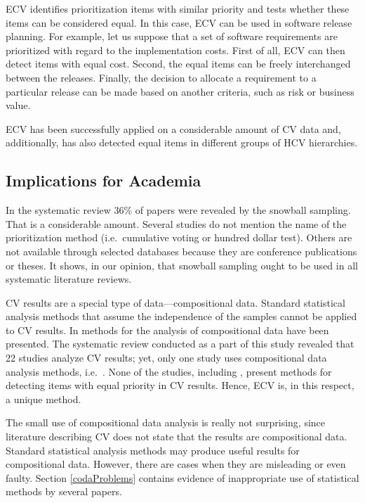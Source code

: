 ECV identifies prioritization items with similar priority and tests whether these items can be considered equal.
In this case, ECV can be used in software release planning.
For example, let us suppose that a set of software requirements are prioritized with regard to the implementation costs.
First of all, ECV can then detect items with equal cost.
Second, the equal items can be freely interchanged between the releases.
Finally, the decision to allocate a requirement to a particular release can be made based on another criteria, such as risk or business value.

ECV has been successfully applied on a considerable amount of CV data and, additionally, has also detected equal items in different groups of HCV hierarchies.

\subsection{Implications for Academia}
In the systematic review 36\% of papers were revealed by the snowball sampling.
That is a considerable amount.
Several studies do not mention the name of the prioritization method (i.e.\ cumulative voting or hundred dollar test).
Others are not available through selected databases because they are conference publications or theses.
It shows, in our opinion, that snowball sampling ought to be used in all systematic literature reviews.

CV results are a special type of data---compositional data.
Standard statistical analysis methods that assume the independence of the samples cannot be applied to CV results.
In \cite{Aitchison1986} methods for the analysis of compositional data have been presented.
The systematic review conducted as a part of this study revealed that 22 studies analyze CV results; yet, only one study uses compositional data analysis methods, i.e.\ \cite{Chatzipetrou2010}.
None of the studies, including \cite{Chatzipetrou2010}, present methods for detecting items with equal priority in CV results. Hence, ECV is, in this respect, a unique method.

The small use of compositional data analysis is really not surprising, since literature describing CV does not state that the results are compositional data.
Standard statistical analysis methods may produce useful results for compositional data.
However, there are cases when they are misleading or even faulty.
Section \ref{codaProblems} contains evidence of inappropriate use of statistical methods by several papers.

